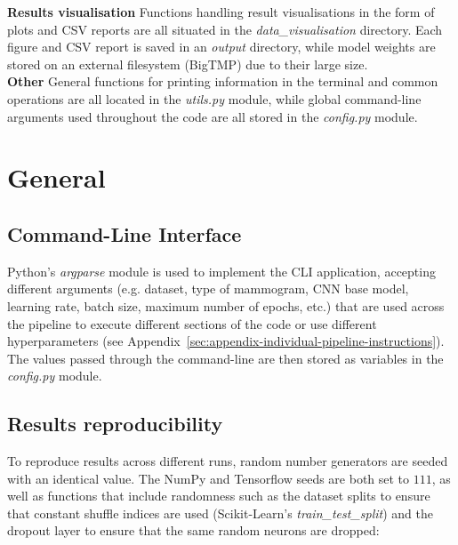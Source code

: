 \textbf{Results visualisation} \space Functions handling result visualisations in the form of plots and CSV reports are all situated in the \textit{data\_visualisation} directory. Each figure and CSV report is saved in an \textit{output} directory, while model weights are stored on an external filesystem (BigTMP) due to their large size.\\

\textbf{Other} \space General functions for printing information in the terminal and common operations are all located in the \textit{utils.py} module, while global command-line arguments used throughout the code are all stored in the \textit{config.py} module.


\section{General}

\subsection{Command-Line Interface}

Python's \textit{argparse} module is used to implement the CLI application, accepting different arguments (e.g. dataset,  type of mammogram, CNN base model, learning rate, batch size, maximum number of epochs, etc.) that are used across the pipeline to execute different sections of the code or use different hyperparameters (see Appendix~\ref{sec:appendix-individual-pipeline-instructions}). The values passed through the command-line are then stored as variables in the \textit{config.py} module.

\subsection{Results reproducibility}
\label{sec:implementation-results-reproducibility}

To reproduce results across different runs, random number generators are seeded with an identical value. The NumPy and Tensorflow seeds are both set to \textit{$111$}, as well as functions that include randomness such as the dataset splits to ensure that constant shuffle indices are used (Scikit-Learn's \textit{train\_test\_split}) and the dropout layer to ensure that the same random neurons are dropped:

